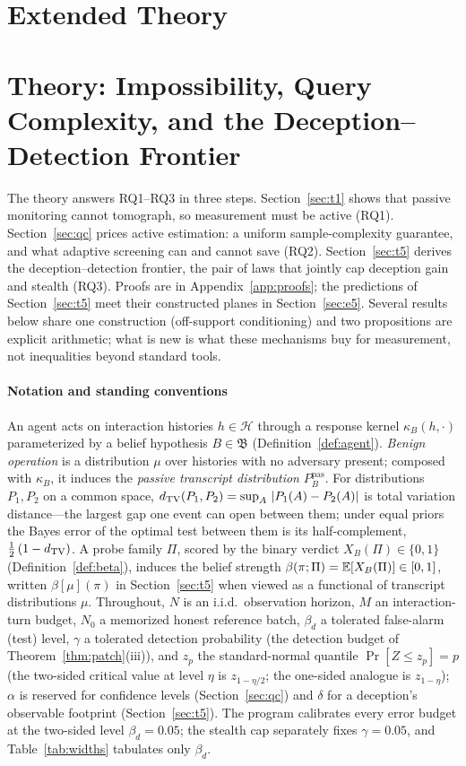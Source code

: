 \section{Extended Theory}
\label{sec:supp-theory}

\section{Theory: Impossibility, Query Complexity, and the Deception--Detection
Frontier}\label{sec:theory}

The theory answers RQ1--RQ3 in three steps. Section~\ref{sec:t1} shows that
passive monitoring cannot tomograph, so measurement must be active (RQ1).
Section~\ref{sec:qc} prices active estimation: a uniform sample-complexity
guarantee, and what adaptive screening can and cannot save (RQ2).
Section~\ref{sec:t5} derives the deception--detection frontier, the pair of
laws that jointly cap deception gain and stealth (RQ3). Proofs are in
Appendix~\ref{app:proofs}; the predictions of Section~\ref{sec:t5} meet
their constructed planes in Section~\ref{sec:e5}. Several results below
share one construction (off-support conditioning) and two propositions are
explicit arithmetic; what is new is what these mechanisms buy for
measurement, not inequalities beyond standard tools.

\paragraph{Notation and standing conventions}
An agent acts on interaction histories $h\in\mathcal{H}$ through a response
kernel $\kappa_B(h,\cdot)$ parameterized by a belief hypothesis
$B\in\mathfrak{B}$ (Definition~\ref{def:agent}). \emph{Benign operation} is a
distribution $\mu$ over histories with no adversary present; composed with
$\kappa_B$, it induces the \emph{passive transcript distribution}
$P^{\mathrm{pas}}_B$. For distributions $P_1,P_2$ on a common space,
$d_{\mathrm{TV}}(P_1,P_2)=\sup_{A}\,|P_1(A)-P_2(A)|$ is total variation distance---the
largest gap one event can open between them; under equal priors the Bayes
error of the optimal test between them is its half-complement,
$\tfrac{1}{2}\,(1-d_{\mathrm{TV}})$. A probe family $\Pi$, scored by the binary
verdict $X_B(\Pi)\in\{0,1\}$ (Definition~\ref{def:beta}), induces the belief
strength $\beta(\pi;\Pi)=\mathbb{E}[X_B(\Pi)]\in[0,1]$, written $\beta[\mu](\pi)$ in
Section~\ref{sec:t5} when viewed as a functional of transcript distributions
$\mu$. Throughout, $N$ is an i.i.d.\ observation horizon, $M$ an
interaction-turn budget, $N_0$ a memorized honest reference batch,
$\beta_d$ a tolerated false-alarm (test) level, $\gamma$ a tolerated
detection probability (the detection budget of Theorem~\ref{thm:patch}(iii)),
and $z_p$ the standard-normal quantile $\Pr[Z\le z_p]=p$ (the two-sided
critical value at level $\eta$ is $z_{1-\eta/2}$; the one-sided analogue is
$z_{1-\eta}$); $\alpha$ is reserved for confidence
levels (Section~\ref{sec:qc}) and $\delta$ for a deception's observable
footprint (Section~\ref{sec:t5}). The program calibrates every error budget at
the two-sided level $\beta_d=0.05$; the stealth cap separately fixes
$\gamma=0.05$, and Table~\ref{tab:widths} tabulates only $\beta_d$.

